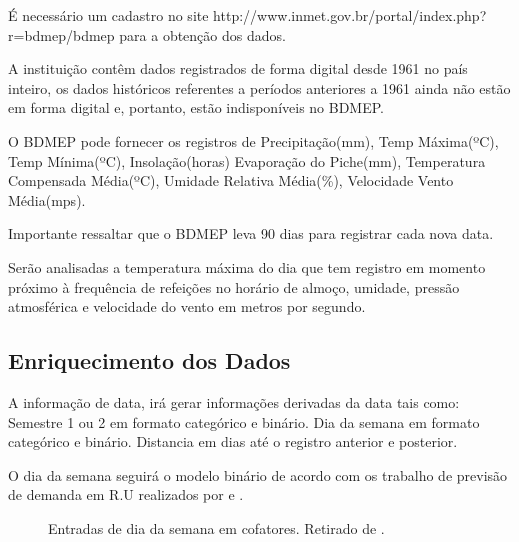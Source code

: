\documentclass[	12pt, Times, openright, twoside, a4paper, english, brazil]{abntex2}
\begin{document}
        	É necessário um cadastro no site http://www.inmet.gov.br/portal/index.php?r=bdmep/bdmep para a obtenção dos dados. 
        	
        	A instituição contêm dados registrados de forma digital desde 1961 no país inteiro, os dados históricos referentes a períodos anteriores a 1961 ainda não estão em forma digital e, portanto, estão indisponíveis no BDMEP.
        	
        	O BDMEP pode fornecer os registros de Precipitação(mm), Temp Máxima(ºC), Temp Mínima(ºC), Insolação(horas)
        	Evaporação do Piche(mm), Temperatura Compensada Média(ºC), Umidade Relativa Média(\%), Velocidade Vento Média(mps).
        	
        	Importante ressaltar que o BDMEP leva 90 dias para registrar cada nova data.
        	
        	Serão analisadas a temperatura máxima do dia que tem registro em momento próximo à frequência de refeições no horário de almoço, umidade, pressão atmosférica e velocidade do vento em metros por segundo.
        	
        	\subsection{Enriquecimento dos Dados}
            	A informação de data, irá gerar informações derivadas da data tais como: 
            	Semestre 1 ou 2 em formato categórico e binário.
            	Dia da semana em formato categórico e binário.
            	Distancia em dias até o registro anterior e posterior.
            	
            	 
            	O dia da semana seguirá o modelo binário de acordo com os trabalho de previsão de demanda em R.U realizados por \cite{Lopes2008} e \cite{Rocha2011}.
        
        \begin{figure}[!ht]
        	\caption{Entradas de dia da semana em cofatores. Retirado de \cite{Lopes2008}.\label{fig:entradasSemanais}}
        \end{figure}
	
\end{document}
